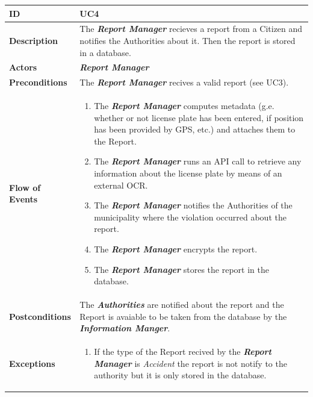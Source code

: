 \documentclass{report}
\begin{document}
\begin{tabularx}{\linewidth}{| l | X |}
	\hline
	\textbf{ID} & UC4\\
	
	\hline
	\textbf{Description} & The \textbf{\textit{Report Manager}} recieves a report from a Citizen and notifies the Authorities about it. Then the report is stored in a database.\\
	
	\hline
	\textbf{Actors} & \textbf{\textit{Report Manager}}\\
	
	\hline
	\textbf{Preconditions} & The \textbf{\textit{Report Manager}} recives a valid report (see UC3).\\
	
	\hline
	\textbf{Flow of Events} & \parbox{0.7\textwidth}{\begin{enumerate}
			\item The \textbf{\textit{Report Manager}} computes metadata (g.e. whether or not license plate has been entered, if position has been provided by GPS, etc.) and attaches them to the Report.
			\item The \textbf{\textit{Report Manager}} runs an API call to retrieve any information about the license plate by means of an external OCR.
			\item The \textbf{\textit{Report Manager}} notifies the Authorities of the municipality where the violation occurred about the report.
			\item The \textbf{\textit{Report Manager}} encrypts the report.	
			\item The \textbf{\textit{Report Manager}} stores the report in the database.
			
	\end{enumerate}}\\
	
	\hline
	\textbf{Postconditions} & The \textbf{\textit{Authorities}} are notified about the report and the Report is avaiable to be taken from the database by the \textbf{\textit{Information Manger}}.\\
	
	\hline
	\textbf{Exceptions} & \parbox{0.7\textwidth}{ \begin{enumerate}
			\item If the type of the Report recived by the \textbf{\textit{Report Manager}} is \textit{Accident} the report is not notify to the authority but it is only stored in the database. 
		\end{enumerate}}\\
	
	\hline
	
\end{tabularx}
\end{document}
